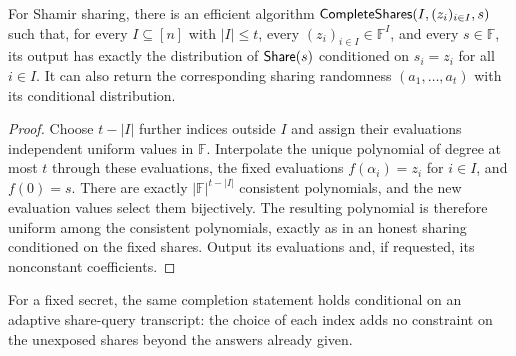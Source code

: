 \begin{lemma}
\label{lem:sharing-completion}
For Shamir sharing, there is an efficient algorithm
$\mathsf{CompleteShares}(I,(z_i)_{i\in I},s)$
such that, for every $I\subseteq[n]$ with $|I|\leq t$, every
$(z_i)_{i\in I}\in\mathbb F^{I}$, and every $s\in\mathbb F$, its output
has exactly the distribution of $\mathsf{Share}(s)$ conditioned on
$s_i=z_i$ for all $i\in I$.  It can also return the corresponding
sharing randomness $(a_1,\ldots,a_t)$ with its conditional distribution.
\end{lemma}
\begin{proof}
Choose $t-|I|$ further indices outside $I$ and assign their evaluations
independent uniform values in $\mathbb F$.  Interpolate the unique
polynomial of degree at most $t$ through these evaluations, the fixed
evaluations $f(\alpha_i)=z_i$ for $i\in I$, and $f(0)=s$.
There are exactly $|\mathbb F|^{t-|I|}$ consistent polynomials, and the
new evaluation values select them bijectively.  The resulting polynomial
is therefore uniform among the consistent polynomials, exactly as in an
honest sharing conditioned on the fixed shares.  Output its evaluations
and, if requested, its nonconstant coefficients.
\end{proof}
For a fixed secret, the same completion statement holds conditional on
an adaptive share-query transcript: the choice of each index adds no
constraint on the unexposed shares beyond the answers already given.
